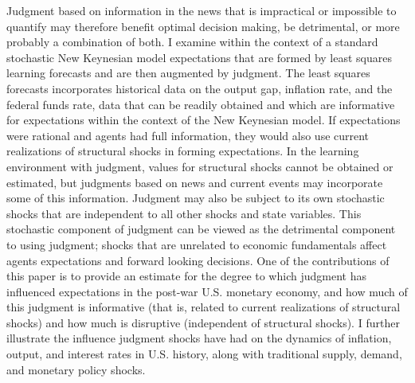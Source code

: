 \documentclass[10pt]{article}
\begin{document}
Judgment based on information in the news that is impractical or impossible to quantify may therefore benefit optimal decision making, be detrimental, or more probably a combination of both.  I examine within the context of a standard stochastic New Keynesian model expectations that are formed by least squares learning forecasts and are then augmented by judgment.  The least squares forecasts incorporates historical data on the output gap, inflation rate, and the federal funds rate, data that can be readily obtained and which are informative for expectations within the context of the New Keynesian model.  If expectations were rational and agents had full information, they would also use current realizations of structural shocks in forming expectations.  In the learning environment with judgment, values for structural shocks cannot be obtained or estimated, but judgments based on news and current events may incorporate some of this information.  Judgment may also be subject to its own stochastic shocks that are independent to all other shocks and state variables.  This stochastic component of judgment can be viewed as the detrimental component to using judgment; shocks that are unrelated to economic fundamentals affect agents expectations and forward looking decisions.  One of the contributions of this paper is to provide an estimate for the degree to which judgment has influenced expectations in the post-war U.S. monetary economy, and how much of this judgment is informative (that is, related to current realizations of structural shocks) and how much is disruptive (independent of structural shocks).  I further illustrate the influence judgment shocks have had on the dynamics of inflation, output, and interest rates in U.S. history, along with traditional supply, demand, and monetary policy shocks.
\end{document}
